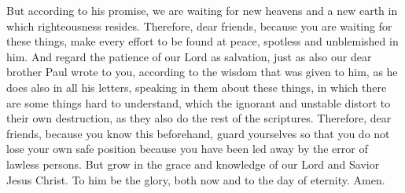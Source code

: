 \begin{biblechapter}
\verse But according to his promise, we are waiting for new heavens and a new earth in which righteousness resides.
 Therefore, dear friends, because you are waiting for these things, make every effort to be found at peace, spotless and unblemished in him.
\verse And regard the patience of our Lord as salvation, just as also our dear brother Paul wrote to you, according to the wisdom that was given to him,
\verse as he does also in all his﻿ letters, speaking in them about these things, in which there are some things hard to understand, which the ignorant and unstable distort to their own destruction, as they also do the rest of the scriptures.
\verse Therefore, dear friends, because you know this beforehand, guard yourselves so that you do not lose your own safe position because you have been led away by the error of lawless persons.
\verse But grow in the grace and knowledge of our Lord and Savior Jesus Christ. To him be the glory, both now and to the day of eternity. Amen.
\end{biblechapter}

